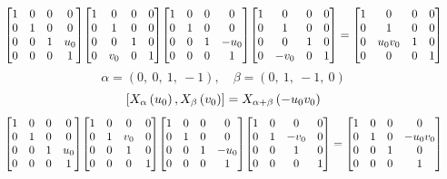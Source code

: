 \documentclass[11pt]{article}
\theoremstyle{definition}
\begin{document}
\[
\scaletoalign{\textwidth}{{\left[\begin{matrix}1 & 0 & 0 & 0\\0 & 1 & 0 & 0\\0 & 0 & 1 & u_{0}\\0 & 0 & 0 & 1\end{matrix}\right]} {\left[\begin{matrix}1 & 0 & 0 & 0\\0 & 1 & 0 & 0\\0 & 0 & 1 & 0\\0 & v_{0} & 0 & 1\end{matrix}\right]} {\left[\begin{matrix}1 & 0 & 0 & 0\\0 & 1 & 0 & 0\\0 & 0 & 1 & - u_{0}\\0 & 0 & 0 & 1\end{matrix}\right]} {\left[\begin{matrix}1 & 0 & 0 & 0\\0 & 1 & 0 & 0\\0 & 0 & 1 & 0\\0 & - v_{0} & 0 & 1\end{matrix}\right]} = {\left[\begin{matrix}1 & 0 & 0 & 0\\0 & 1 & 0 & 0\\0 & u_{0} v_{0} & 1 & 0\\0 & 0 & 0 & 1\end{matrix}\right]}}
\]
\[
\alpha = \left( 0, \  0, \  1, \  -1\right), \quad \beta = \left( 0, \  1, \  -1, \  0\right)
\]
\[
\scaletoalign{\textwidth}{\left[ X_{\alpha}\left(u_{0}\right), X_{\beta}\left(v_{0}\right) \right] = X_{\alpha + \beta}\left(- u_{0} v_{0}\right)}
\]
\[
\scaletoalign{\textwidth}{{\left[\begin{matrix}1 & 0 & 0 & 0\\0 & 1 & 0 & 0\\0 & 0 & 1 & u_{0}\\0 & 0 & 0 & 1\end{matrix}\right]} {\left[\begin{matrix}1 & 0 & 0 & 0\\0 & 1 & v_{0} & 0\\0 & 0 & 1 & 0\\0 & 0 & 0 & 1\end{matrix}\right]} {\left[\begin{matrix}1 & 0 & 0 & 0\\0 & 1 & 0 & 0\\0 & 0 & 1 & - u_{0}\\0 & 0 & 0 & 1\end{matrix}\right]} {\left[\begin{matrix}1 & 0 & 0 & 0\\0 & 1 & - v_{0} & 0\\0 & 0 & 1 & 0\\0 & 0 & 0 & 1\end{matrix}\right]} = {\left[\begin{matrix}1 & 0 & 0 & 0\\0 & 1 & 0 & - u_{0} v_{0}\\0 & 0 & 1 & 0\\0 & 0 & 0 & 1\end{matrix}\right]}}
\]
\end{document}
